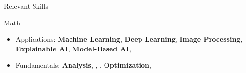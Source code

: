 \begin{cvsection}{Relevant Skills}
  \begin{cvsubsection}{Math}{}{ }	
     \begin{itemize}
            \item Applications: 
            \textbf{Machine Learning}, 
            \textbf{Deep Learning}, 
            \textbf{Image Processing}, 
            \textbf{Explainable AI},
            \textbf{Model-Based AI},
            \item Fundamentals:  
            \textbf{Analysis}, 
            , 
            , 
            \textbf{Optimization},
        \end{itemize}
    \end{cvsubsection}



\end{cvsection}
